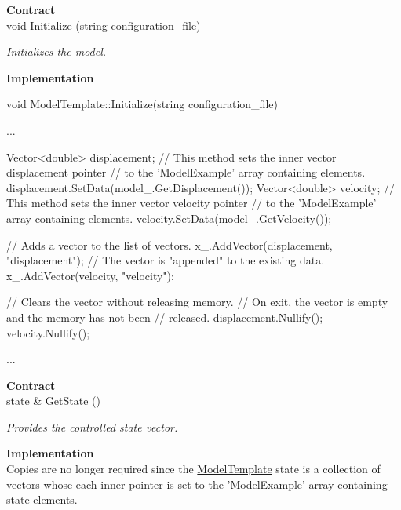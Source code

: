 \documentclass{tufte-book}
\begin{document}
\begin{enumerate}
\textbf{Contract}\\

void \hyperlink{class_verdandi_1_1_model_template_a986ea8e6681bff1219716418a351fab0}{\-Initialize} (string configuration\-\_\-file)
\begin{DoxyCompactList}\small\item\em \-Initializes the model. \end{DoxyCompactList}


\textbf{Implementation}\\

\begin{frame_cpp}
    void ModelTemplate::Initialize(string configuration_file)
    {
    	...

        Vector<double> displacement;
        // This method sets the inner vector displacement pointer
        // to the 'ModelExample' array containing elements.
        displacement.SetData(model_.GetDisplacement());
        Vector<double> velocity;
        // This method sets the inner vector velocity pointer
        // to the 'ModelExample' array containing elements.
        velocity.SetData(model_.GetVelocity());

        // Adds a vector to the list of vectors.
        x_.AddVector(displacement, "displacement");
        // The vector is "appended" to the existing data.
        x_.AddVector(velocity, "velocity");

        // Clears the vector without releasing memory.
        // On exit, the vector is empty and the memory has not been
        // released.
        displacement.Nullify();
        velocity.Nullify();

        ...
    }
\end{frame_cpp}

\textbf{Contract}\\

\hyperlink{class_verdandi_1_1_model_template_a6bb9efb7898f067bb21780159b497ba7}{state} \& \hyperlink{class_verdandi_1_1_model_template_ae014bde61361001da52aab36d89f0048}{\-Get\-State} ()
\begin{DoxyCompactList}\small\item\em \-Provides the controlled state vector. \end{DoxyCompactList}


\textbf{Implementation}\\

Copies are no longer required since the  {\ttfamily  \hyperlink{model_template}{\-Model\-Template}} state is a collection of vectors whose each inner pointer is set to the 'ModelExample' array containing state elements.


\end{enumerate}
\end{document}
